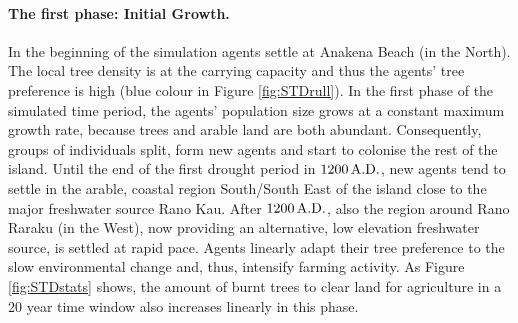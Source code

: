 \paragraph{The first phase: Initial Growth.}
In the beginning of the simulation agents settle at Anakena Beach (in the North). 
The local tree density is at the carrying capacity and thus the agents' tree preference is high (blue colour in Figure \ref{fig:STDrull}).
In the first phase of the simulated time period, the agents' population size grows at a constant maximum growth rate, because trees and arable land are both abundant. 
Consequently, groups of individuals split, form new agents and start to colonise the rest of the island. %
Until the end of the first drought period in $1200\, {\rm A.D.}$, new agents tend to settle in the arable, coastal region South/South East of the island close to the major freshwater source Rano Kau. 
After $1200\, {\rm A.D.}$, also the region around Rano Raraku (in the West), now providing an alternative, low elevation freshwater source, is settled at rapid pace.
Agents linearly adapt their tree preference to the slow environmental change and, thus, intensify farming activity.
As Figure \ref{fig:STDstats} shows, the amount of burnt trees to clear land for agriculture in a $20$ year time window also increases linearly in this phase.

